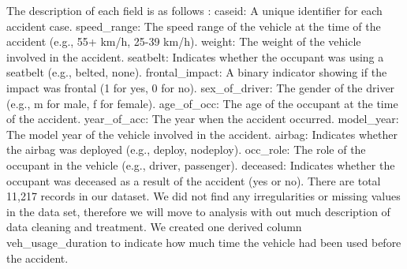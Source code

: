 \documentclass[12pt,a4paper]{article}
\begin{document}
The description of each field is as follows : 
caseid: A unique identifier for each accident case.
speed\_range: The speed range of the vehicle at the time of the accident (e.g., 55+ km/h, 25-39 km/h).
weight: The weight of the vehicle involved in the accident.
seatbelt: Indicates whether the occupant was using a seatbelt (e.g., belted, none).
frontal\_impact: A binary indicator showing if the impact was frontal (1 for yes, 0 for no).
sex\_of\_driver: The gender of the driver (e.g., m for male, f for female).
age\_of\_occ: The age of the occupant at the time of the accident.
year\_of\_acc: The year when the accident occurred.
model\_year: The model year of the vehicle involved in the accident.
airbag: Indicates whether the airbag was deployed (e.g., deploy, nodeploy).
occ\_role: The role of the occupant in the vehicle (e.g., driver, passenger).
deceased: Indicates whether the occupant was deceased as a result of the accident (yes or no). There are total 11,217 records in our dataset. We did not find any irregularities or missing values in the data set, therefore we will move to analysis with out much description of data cleaning and treatment. We created one derived column veh\_usage\_duration to indicate how much time the vehicle had been used before the accident.	
\end{document}
